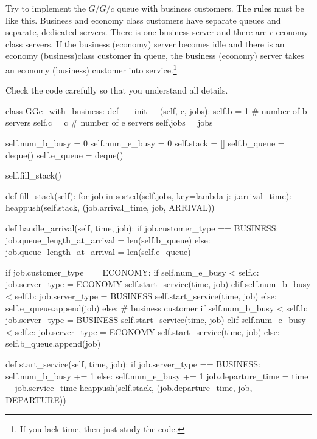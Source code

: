 \begin{exercise}
  Try to implement the $G/G/c$ queue with business customers. The rules must be like this. Business and economy class customers have separate queues and separate, dedicated servers. There is one business server and there are $c$ economy class servers. If the business (economy) server becomes  idle and there is an economy (business)class customer in queue, the business (economy) server takes an economy (business) customer into service.\footnote{If you lack time, then just study the code.}

  \begin{solution}
    Check the code carefully so that you understand all details. 
\begin{pyverbatim}
class GGc_with_business:
    def __init__(self, c, jobs):
        self.b = 1  # number of b servers
        self.c = c  # number of e servers
        self.jobs = jobs

        self.num_b_busy = 0  
        self.num_e_busy = 0  
        self.stack = []  
        self.b_queue = deque()
        self.e_queue = deque()

        self.fill_stack()

    def fill_stack(self):
        for job in sorted(self.jobs, key=lambda j: j.arrival_time):
            heappush(self.stack, (job.arrival_time, job, ARRIVAL))

    def handle_arrival(self, time, job):
        if job.customer_type == BUSINESS:
            job.queue_length_at_arrival = len(self.b_queue)
        else:
            job.queue_length_at_arrival = len(self.e_queue)

        if job.customer_type == ECONOMY:
            if self.num_e_busy < self.c:
                job.server_type = ECONOMY
                self.start_service(time, job)
            elif self.num_b_busy < self.b:
                job.server_type = BUSINESS
                self.start_service(time, job)
            else:
                self.e_queue.append(job)
        else: # business customer
            if self.num_b_busy < self.b:
                job.server_type = BUSINESS
                self.start_service(time, job)
            elif self.num_e_busy < self.c:
                job.server_type = ECONOMY
                self.start_service(time, job)
            else:
                self.b_queue.append(job)
            
    def start_service(self, time, job):
        if job.server_type == BUSINESS:
            self.num_b_busy += 1 
        else:
            self.num_e_busy += 1 
        job.departure_time = time + job.service_time
        heappush(self.stack, (job.departure_time, job, DEPARTURE))


\end{pyverbatim}
\end{solution}
\end{exercise}
